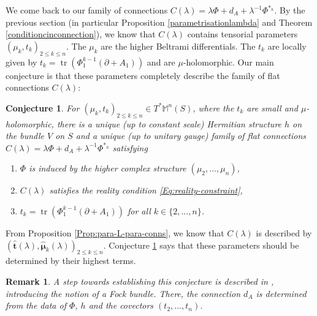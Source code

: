 \documentclass[11pt]{amsart}
\newtheorem{conj}[thm]{Conjecture}
\newtheorem{prop}[thm]{Proposition}
\newtheorem{Remark}[thm]{Remark}
\numberwithin{thm}{section} %
\numberwithin{equation}{section} %
\numberwithin{figure}{section} %
\newcommand*{\R}{\mathbb{R}}
\renewcommand*{\S}{S}
\renewcommand*{\l}{\lambda}
\DeclareMathOperator{\tr}{tr}
\DeclareMathOperator{\SL}{SL}
\begin{document}
We come back to our family of connections $C(\l)=\l\Phi + d_A + \l^{-1}\Phi^{*_h}$. By the previous section (in particular Proposition \ref{parametrisationlambda} and Theorem \ref{conditioncinconnection}), we know that $C(\l)$ contains tensorial parameters $(\mu_k,t_k)_{2\leq k\leq n}$. The $\mu_k$ are the higher Beltrami differentials. The $t_k$ are locally given by $t_k=\tr(\Phi_1^{k-1}(\partial+A_1))$ and are $\mu$-holomorphic.
Our main conjecture is that these parameters completely describe the family of flat connections $C(\l)$:

\begin{conj}\label{nahc}
For $(\mu_k,t_k)_{2\leq k\leq n}\in T^*\mathbb{M}^n(\S)$, where the $t_k$ are small and $\mu$-holomorphic, there is a unique (up to constant scale) Hermitian structure $h$ on the bundle $V$ on $\S$ and a unique (up to unitary gauge) family of flat connections $C(\l)=\l\Phi+d_A+\l^{-1}\Phi^{*_h}$ satisfying
\begin{enumerate}
\item $\Phi$ is induced by the higher complex structure $(\mu_2,...,\mu_n)$,
\item $C(\l)$ satisfies the reality condition \eqref{Eq:reality-constraint},
\item $t_k=\tr(\Phi_1^{k-1}(\partial+A_1))$ for all $k\in\{2,...,n\}$.
\end{enumerate}
\end{conj}

From Proposition \ref{Prop:para-L-para-conns}, we know that $C(\l)$ is described by $(\bm\hat{t}(\l),\bm\hat{\mu}_k(\l))_{2\leq k\leq n}$. Conjecture \ref{nahc} says that these parameters should be determined by their highest terms.

\begin{Remark}
A step towards establishing this conjecture is described in \cite{Fock-bundles}, introducing the notion of a \emph{Fock bundle}. There, the connection $d_A$ is determined from the data of $\Phi$, $h$ and the covectors $(t_2,...,t_n)$. 
\end{Remark}

\end{document}
